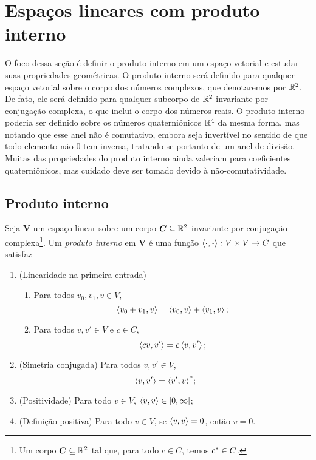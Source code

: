 \chapter{Espaços lineares com produto interno}

O foco dessa seção é definir o produto interno em um espaço vetorial e estudar suas propriedades geométricas. O produto interno será definido para qualquer espaço vetorial sobre o corpo dos números complexos, que denotaremos por $\mathbb{R}^2$. De fato, ele será definido para qualquer subcorpo de $\mathbb{R}^2$ invariante por conjugação complexa, o que inclui o corpo dos números reais. O produto interno poderia ser definido sobre os números quaterniônicos $\mathbb{R}^4$ da mesma forma, mas notando que esse anel não é comutativo, embora seja invertível no sentido de que todo elemento não $0$ tem inversa, tratando-se portanto de um anel de divisão. Muitas das propriedades do produto interno ainda valeriam para coeficientes quaterniônicos, mas cuidado deve ser tomado devido à não-comutatividade.

\section{Produto interno}

\begin{definition}
Seja $\bm V$ um espaço linear sobre um corpo $\bm C \subseteq \mathbb{R}^2$ invariante por conjugação complexa\footnote{Um corpo $\bm C \subseteq \mathbb{R}^2$ tal que, para todo $c \in C$, temos ${c}^{\ast} \in C$.}. Um \emph{produto interno} em $\bm V$ é uma função $\left\langle{\bm{\cdot}},{\bm{\cdot}}\right\rangle\colon V \times V \to C$ que satisfaz
	\begin{enumerate}
	\item (Linearidade na primeira entrada)
		\begin{enumerate}
		\item Para todos $v_0,v_1,v \in V$,
			\begin{equation*}
			\left\langle{v_0+v_1},{v}\right\rangle = \left\langle{v_0},{v}\right\rangle + \left\langle{v_1},{v}\right\rangle;
			\end{equation*}
		\item Para todos $v,v' \in V$ e $c \in C$,
			\begin{equation*}
			\left\langle{cv},{v'}\right\rangle = c\left\langle{v},{v'}\right\rangle;
			\end{equation*}
		\end{enumerate}
	\item (Simetria conjugada) Para todos $v,v' \in V$,
		\begin{equation*}
		\left\langle{v},{v'}\right\rangle = {\left\langle{v'},{v}\right\rangle}^{\ast};
		\end{equation*}
	\item (Positividade) Para todo $v \in V$, $\left\langle{v},{v}\right\rangle \in \left[0,\allowbreak \infty\right[$;
	\item (Definição positiva) Para todo $v \in V$, se $\left\langle{v},{v}\right\rangle=0$, então $v=0$.
		\end{enumerate}
\end{definition}

